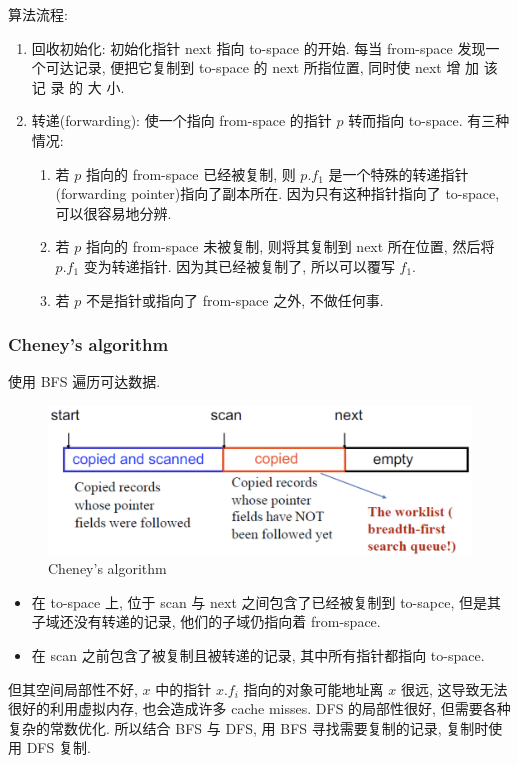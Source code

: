 算法流程:
\begin{enumerate}
    \item 回收初始化: 初始化指针 next 指向 to-space 的开始. 每当 from-space 发现一个可达记录, 便把它复制到 to-space 的 next 所指位置, 同时使 next 增 加 该 记 录 的 大 小. 
    \item 转递(forwarding): 使一个指向 from-space 的指针 $p$ 转而指向 to-space. 有三种情况:
    \begin{enumerate}
        \item 若 $p$ 指向的 from-space 已经被复制, 则 $p.f_1$ 是一个特殊的转递指针(forwarding pointer)指向了副本所在. 因为只有这种指针指向了 to-space, 可以很容易地分辨. 
        \item 若 $p$ 指向的 from-space 未被复制, 则将其复制到 next 所在位置, 然后将 $p.f_1$ 变为转递指针. 因为其已经被复制了, 所以可以覆写 $f_1$.
        \item 若 $p$ 不是指针或指向了 from-space 之外, 不做任何事. 
    \end{enumerate}
\end{enumerate}

\subsubsection{Cheney's algorithm}
使用 BFS 遍历可达数据. 

\begin{figure}[H]
    \centering
    \includegraphics[width=0.84\linewidth]{pic/CP13/Cheney's algorithm}
    \caption{Cheney's algorithm}
\end{figure}

\begin{itemize}
    \item 在 to-space 上, 位于 scan 与 next 之间包含了已经被复制到 to-sapce, 但是其子域还没有转递的记录, 他们的子域仍指向着 from-space. 
    \item 在 scan 之前包含了被复制且被转递的记录, 其中所有指针都指向 to-space.
\end{itemize}

但其空间局部性不好, $x$ 中的指针 $x.f_i$ 指向的对象可能地址离 $x$ 很远, 这导致无法很好的利用虚拟内存, 也会造成许多 cache misses.  DFS 的局部性很好, 但需要各种复杂的常数优化. 所以结合 BFS 与 DFS, 用 BFS 寻找需要复制的记录, 复制时使用 DFS 复制. 


